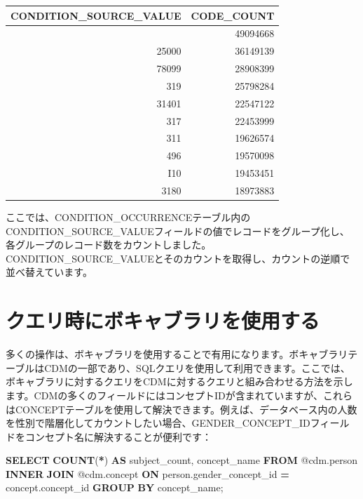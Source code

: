 \documentclass[
  11pt]{book}
\newenvironment{Shaded}{\begin{snugshade}}{\end{snugshade}}
\newcommand{\FunctionTok}[1]{\textcolor[rgb]{0.13,0.29,0.53}{\textbf{#1}}}
\newcommand{\KeywordTok}[1]{\textcolor[rgb]{0.13,0.29,0.53}{\textbf{#1}}}
\newcommand{\NormalTok}[1]{#1}
\newcommand{\OperatorTok}[1]{\textcolor[rgb]{0.81,0.36,0.00}{\textbf{#1}}}
\theoremstyle{definition}
\theoremstyle{definition}
\theoremstyle{definition}
\theoremstyle{definition}
\theoremstyle{remark}
\begin{document}
\begin{longtable}[]{@{}rr@{}}
\toprule\noalign{}
CONDITION\_SOURCE\_VALUE & CODE\_COUNT \\
\midrule\noalign{}
\endhead
\bottomrule\noalign{}
\endlastfoot
4019 & 49094668 \\
25000 & 36149139 \\
78099 & 28908399 \\
319 & 25798284 \\
31401 & 22547122 \\
317 & 22453999 \\
311 & 19626574 \\
496 & 19570098 \\
I10 & 19453451 \\
3180 & 18973883 \\
\end{longtable}

ここでは、CONDITION\_OCCURRENCEテーブル内のCONDITION\_SOURCE\_VALUEフィールドの値でレコードをグループ化し、各グループのレコード数をカウントしました。CONDITION\_SOURCE\_VALUEとそのカウントを取得し、カウントの逆順で並べ替えています。

\section{クエリ時にボキャブラリを使用する}\label{ux30afux30a8ux30eaux6642ux306bux30dcux30adux30e3ux30d6ux30e9ux30eaux3092ux4f7fux7528ux3059ux308b}

多くの操作は、ボキャブラリを使用することで有用になります。ボキャブラリテーブルはCDMの一部であり、SQLクエリを使用して利用できます。ここでは、ボキャブラリに対するクエリをCDMに対するクエリと組み合わせる方法を示します。CDMの多くのフィールドにはコンセプトIDが含まれていますが、これらはCONCEPTテーブルを使用して解決できます。例えば、データベース内の人数を性別で階層化してカウントしたい場合、GENDER\_CONCEPT\_IDフィールドをコンセプト名に解決することが便利です：

\begin{Shaded}
\begin{Highlighting}[]
\KeywordTok{SELECT} \FunctionTok{COUNT}\NormalTok{(}\OperatorTok{*}\NormalTok{) }\KeywordTok{AS}\NormalTok{ subject\_count,}
\NormalTok{  concept\_name}
\KeywordTok{FROM}\NormalTok{ @cdm.person}
\KeywordTok{INNER} \KeywordTok{JOIN}\NormalTok{ @cdm.concept}
  \KeywordTok{ON}\NormalTok{ person.gender\_concept\_id }\OperatorTok{=}\NormalTok{ concept.concept\_id}
\KeywordTok{GROUP} \KeywordTok{BY}\NormalTok{ concept\_name;}
\end{Highlighting}
\end{Shaded}
\end{document}

